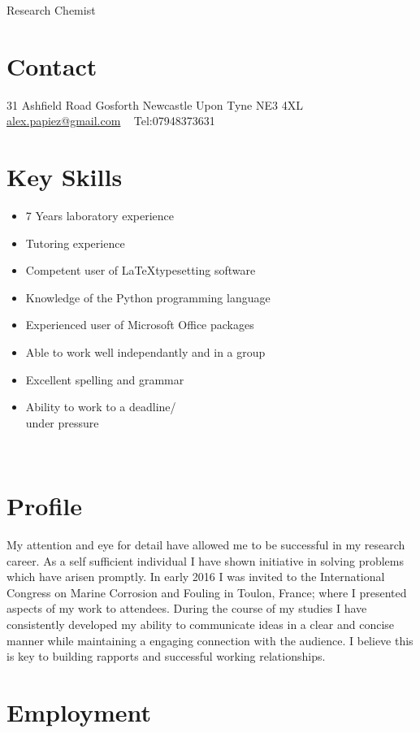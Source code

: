 \documentclass[]{friggeri-cv}
\begin{document}
       {Research Chemist}
       {}


\begin{aside}
 \vspace{-0.5cm}
  \section{Contact}
    31 Ashfield Road
    Gosforth
    Newcastle Upon Tyne
    NE3 4XL
    ~
    \href{mailto:alex.papiez@gmail.com}{alex.papiez@gmail.com}
    ~
    Tel:07948373631
    ~
  \section{Key Skills}
   \begin{itemize}
   \item 7 Years laboratory experience
   \item Tutoring experience
   \item Competent user of \LaTeX typesetting software
   \item Knowledge of the Python programming language
   \item Experienced user of Microsoft Office packages
   \item Able to work well independantly and in a group
   \item Excellent spelling and grammar
   \item Ability to work to a deadline/ \\ under pressure
   \end{itemize}
   ~
   ~
\end{aside}
\vspace{-0.6cm}
\section{Profile}
My attention and eye for detail have allowed me to be successful in my research career. As a self sufficient individual I have shown initiative in solving problems which have arisen promptly. In early 2016 I was invited to the International Congress on Marine Corrosion and Fouling in Toulon, France; where I presented aspects of my work to attendees. During the course of my studies I have consistently developed my ability to communicate ideas in a clear and concise manner while maintaining a engaging connection with the audience. I believe this is key to building rapports and successful working relationships. 
\section{Employment}
\end{document}
